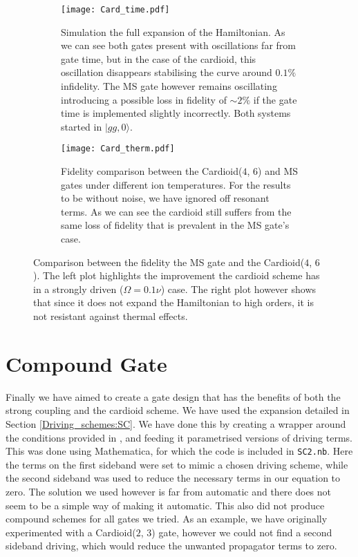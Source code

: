 \documentclass[12pt,twoside]{report}
\begin{document}
\begin{figure}[t!]
	\centering
	\begin{subfigure}[t]{0.475\textwidth}
		\centering
		\texttt{[image: Card\_time.pdf]}
		\caption{Simulation the full expansion of the Hamiltonian. As we can see both gates present with oscillations far from gate time, but in the case of the cardioid, this oscillation disappears stabilising the curve around $0.1\%$ infidelity. The MS gate however remains oscillating introducing a possible loss in fidelity of $\sim 2\%$ if the gate time is implemented slightly incorrectly. Both systems started in $|gg,0\rangle$.}
		\label{fig:cardioid:full}
	\end{subfigure}
	\hfill
	\begin{subfigure}[t]{0.475\textwidth}
		\centering
		\texttt{[image: Card\_therm.pdf]}
		\caption{Fidelity comparison between the Cardioid($4$, $6$) and MS gates under different ion temperatures. For the results to be without noise, we have ignored off resonant terms. As we can see the cardioid still suffers from the same loss of fidelity that is prevalent in the MS gate's case.}
		\label{fig:cardioid:therm}
	\end{subfigure}
	\caption[Cardioid gate comparison]{Comparison between the fidelity the MS gate and the Cardioid($4$, $6$). The left plot highlights the improvement the cardioid scheme has in a strongly driven ($\Omega = 0.1\nu$) case. The right plot however shows that since it does not expand the Hamiltonian to high orders, it is not resistant against thermal effects.}
	\label{fig:cardioid}
\end{figure}

\section{Compound Gate}
\label{Driving_schemes:Compound}

Finally we have aimed to create a gate design that has the benefits of both the strong coupling and the cardioid scheme. We have used the expansion detailed in Section \ref{Driving_schemes:SC}. We have done this by creating a wrapper around the conditions provided in \cite{SC_github}, and feeding it parametrised versions of driving terms. This was done using Mathematica, for which the code is included in \texttt{SC2.nb}. Here the terms on the first sideband were set to mimic a chosen driving scheme, while the second sideband was used to reduce the necessary terms in our equation to zero. The solution we used however is far from automatic and there does not seem to be a simple way of making it automatic. This also did not produce compound schemes for all gates we tried. As an example, we have originally experimented with a Cardioid($2$, $3$) gate, however we could not find a second sideband driving, which would reduce the unwanted propagator terms to zero.
\end{document}
